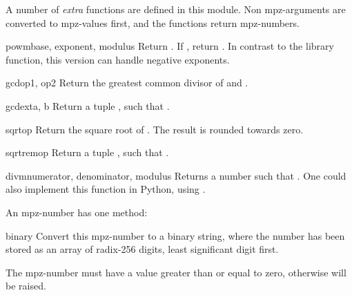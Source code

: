 A number of \emph{extra} functions are defined in this module. Non
mpz-arguments are converted to mpz-values first, and the functions
return mpz-numbers.

\begin{funcdesc}{powm}{base, exponent, modulus}
  Return . If
  , return . In contrast to the
  \C{} library function, this version can handle negative exponents.
\end{funcdesc}

\begin{funcdesc}{gcd}{op1, op2}
  Return the greatest common divisor of  and .
\end{funcdesc}

\begin{funcdesc}{gcdext}{a, b}
  Return a tuple , such that
  .
\end{funcdesc}

\begin{funcdesc}{sqrt}{op}
  Return the square root of . The result is rounded towards zero.
\end{funcdesc}

\begin{funcdesc}{sqrtrem}{op}
  Return a tuple , such that
  .
\end{funcdesc}

\begin{funcdesc}{divm}{numerator, denominator, modulus}
  Returns a number  such that
  .  One could also implement this function in Python,
  using .
\end{funcdesc}

An mpz-number has one method:

\begin{methoddesc}[mpz]{binary}{}
  Convert this mpz-number to a binary string, where the number has been
  stored as an array of radix-256 digits, least significant digit first.

  The mpz-number must have a value greater than or equal to zero,
  otherwise  will be raised.
\end{methoddesc}
